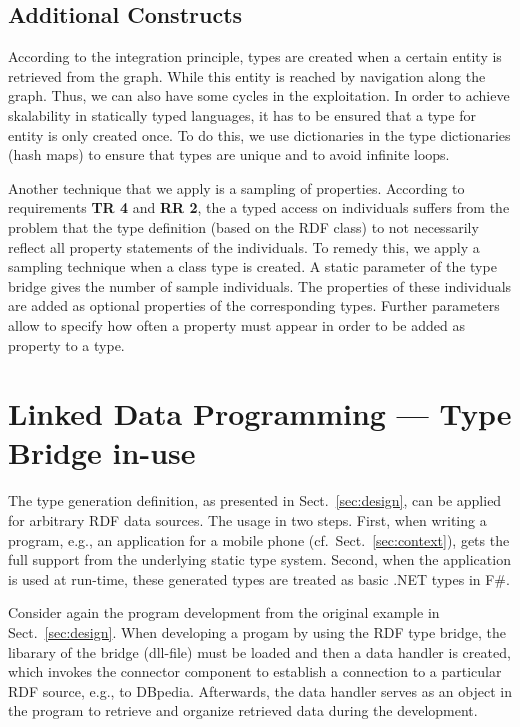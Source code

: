 \documentclass{llncs} %
\newcommand{\fs}{\textsf{F\#}\xspace}
\newcommand{\rr}[1]{\textbf{RR #1}}
\newcommand{\tr}[1]{\textbf{TR #1}}
\begin{document}
\subsection{Additional Constructs}

According to the integration principle, types are created when a certain entity is retrieved from the graph. While this entity is reached
by navigation along the graph. Thus, we can also have some cycles in the exploitation. In order to achieve skalability in
statically typed languages, it has to be ensured that a type for entity is only created once.
To do this, we use dictionaries in the type dictionaries (hash maps) to ensure that types are unique and to avoid infinite loops.

Another technique that we apply is a sampling of properties. According to requirements \tr{4} and \rr{2}, the a typed access on individuals
suffers from the problem that the type definition (based on the RDF class) to not necessarily reflect all property statements
of the individuals. To remedy this, we apply a sampling technique when a class type is created.
A static parameter of the type bridge gives the number of sample individuals. The properties of these individuals
are added as optional properties of the corresponding types. Further parameters allow to specify
how often a property must appear in order to be added as property to a type.

	
\section{Linked Data Programming --- Type Bridge in-use}
\label{sec:usage}

The type generation definition, as presented in Sect.~\ref{sec:design}, can be applied for arbitrary RDF data sources.
The usage in two steps. First, when writing a program, e.g., an application for a mobile phone (cf.~Sect.~\ref{sec:context}),
gets the full support from the underlying static type system.
Second, when the application is used at run-time, these generated types are treated as basic .NET types in \fs.

Consider again the program development from the original example in Sect.~\ref{sec:design}.
When developing a progam by using the RDF type bridge, the libarary of the bridge (dll-file) must
be loaded and then a data handler is created, which invokes the connector component to
establish a connection to a particular RDF source, e.g., to DBpedia. Afterwards, the data handler
serves as an object in the program to retrieve and organize retrieved data during the development.
\end{document}
